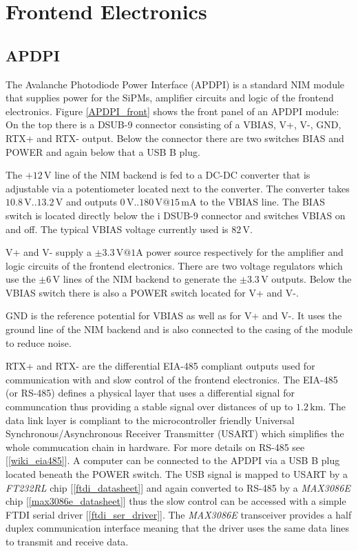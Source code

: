 \documentclass[]{article}
\begin{document}
\newpage
\section{Frontend Electronics}
\subsection{APDPI}

The Avalanche Photodiode Power Interface (APDPI) is a standard NIM module that supplies power for the SiPMs, amplifier circuits and logic of the frontend electronics.
Figure \ref{APDPI_front} shows the front panel of an APDPI module: On the top there is a DSUB-9 connector consisting of a VBIAS, V+, V-, GND, RTX+ and RTX- output.
Below the connector there are two switches BIAS and POWER and again below that a USB B plug.

The $+12\,\text{V}$ line of the NIM backend is fed to a DC-DC converter that is adjustable via a potentiometer located next to the converter.
The converter takes $10.8\,\text{V} .. 13.2\,\text{V}$ and outputs $0\,\text{V} .. 180\,\text{V}@15\,\text{mA}$ to the VBIAS line. The BIAS switch is located directly below the i
DSUB-9 connector and switches VBIAS on and off. The typical VBIAS voltage currently used is $82\,\text{V}$.

V+ and V- supply a $\pm3.3\,\text{V}@1\text{A}$ power source respectively for the amplifier and logic circuits of the frontend electronics. There are two voltage regulators 
which use the $\pm6\,\text{V}$ lines of the NIM backend to generate the $\pm3.3\,\text{V}$ outputs. Below the VBIAS switch there is also a POWER switch located for V+ and V-.

GND is the reference potential for VBIAS as well as for V+ and V-. It uses the ground line of the NIM backend and is also connected to the casing of the 
module to reduce noise.

RTX+ and RTX- are the differential EIA-485 compliant outputs used for communication with and slow control of the frontend electronics. The EIA-485 (or RS-485) 
defines a physical layer that uses a differential signal for communcation thus providing a stable signal over distances of up to $1.2\,\text{km}$. The data link layer is 
compliant to the microcontroller friendly Universal Synchronous/Asynchronous Receiver Transmitter (USART) which simplifies the whole commucation chain in hardware. 
For more details on RS-485 see [\ref{wiki_eia485}].
A computer can be connected to the APDPI via a USB B plug located beneath the POWER switch. The USB signal is mapped to USART by a \emph{FT232RL} 
chip [\ref{ftdi_datasheet}] and again converted to RS-485 by a \emph{MAX3086E} chip [\ref{max3086e_datasheet}] thus the slow control can be accessed with a simple 
FTDI serial driver [\ref{ftdi_ser_driver}].
The \emph{MAX3086E} transceiver provides a half duplex communication interface meaning that the driver uses the same data lines to transmit and receive data.
\end{document}
